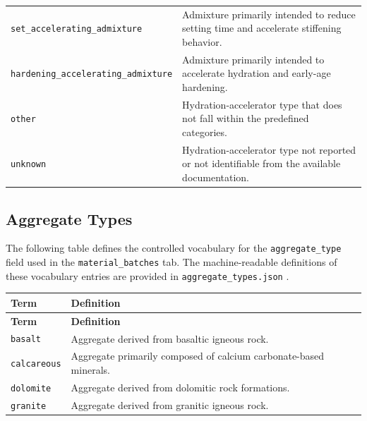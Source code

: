 \documentclass[11pt]{book}
\begin{document}
{\begin{longtable}{p{}p{}}
\texttt{set\_accelerating\_admixture} &
Admixture primarily intended to reduce setting time and accelerate stiffening behavior. \\

\texttt{hardening\_accelerating\_admixture} &
Admixture primarily intended to accelerate hydration and early-age hardening. \\

\texttt{other} &
Hydration-accelerator type that does not fall within the predefined categories. \\

\texttt{unknown} &
Hydration-accelerator type not reported or not identifiable from the available documentation. \\

\hline
\end{longtable}

\subsection{Aggregate Types}
\label{vocab:aggregate_type_list}

The following table defines the controlled vocabulary for the \texttt{aggregate\_type} field used in the \texttt{material\_batches} tab. The machine-readable definitions of these vocabulary entries are provided in \texttt{aggregate\_types.json} .

\begin{longtable}{p{}p{}}
\hline
\textbf{Term} & \textbf{Definition} \\
\hline
\endfirsthead

\hline
\textbf{Term} & \textbf{Definition} \\
\hline
\endhead

\texttt{basalt} &
Aggregate derived from basaltic igneous rock. \\

\texttt{calcareous} &
Aggregate primarily composed of calcium carbonate-based minerals. \\

\texttt{dolomite} &
Aggregate derived from dolomitic rock formations. \\

\texttt{granite} &
Aggregate derived from granitic igneous rock. \\


\end{longtable}}
\end{document}
